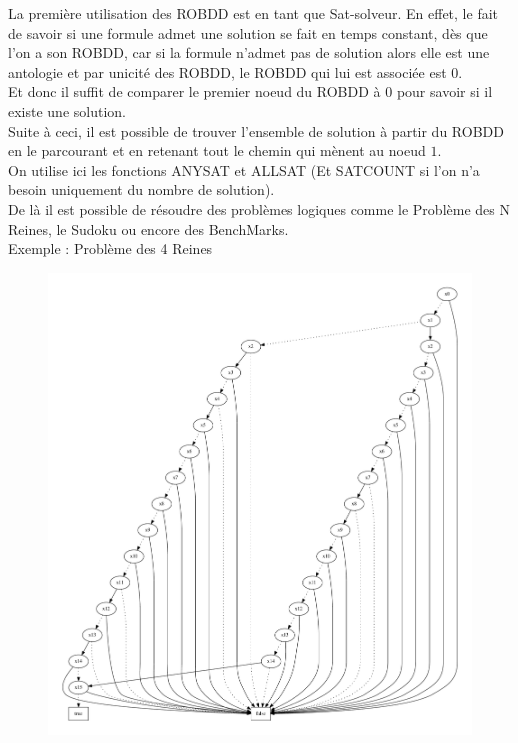 \documentclass[a4paper, oneside]{report}
\begin{document}
La première utilisation des ROBDD est en tant que Sat-solveur. En effet, le fait de savoir si une formule admet une solution se fait en temps constant, dès que l'on a son ROBDD, car si la formule n'admet pas de solution alors elle est une antologie et par unicité des ROBDD, le ROBDD qui lui est associée est $0$.\\
Et donc il suffit de comparer le premier noeud du ROBDD à $0$ pour savoir si il existe une solution.\\

Suite à ceci, il est possible de trouver l'ensemble de solution à partir du ROBDD en le parcourant et en retenant tout le chemin qui mènent au noeud $1$.\\

On utilise ici les fonctions ANYSAT et ALLSAT (Et SATCOUNT si l'on n'a besoin uniquement du nombre de solution).\\

De là il est possible de résoudre des problèmes logiques comme le Problème des N Reines, le Sudoku ou encore des BenchMarks.\\

Exemple : Problème des 4 Reines\\

\begin{figure}[h]
\includegraphics[scale = 0.18]{exemple/queen_4.pdf}
\end{figure}
\end{document}
